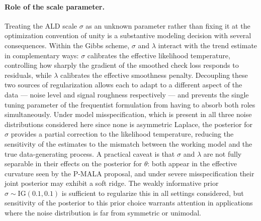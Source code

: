 \paragraph{Role of the scale parameter.}
Treating the ALD scale $\sigma$ as an unknown parameter rather than fixing it at the optimization convention of unity is a substantive modeling decision with several consequences. Within the Gibbs scheme, $\sigma$ and $\lambda$ interact with the trend estimate in complementary ways: $\sigma$ calibrates the effective likelihood temperature, controlling how sharply the gradient of the smoothed check loss responds to residuals, while $\lambda$ calibrates the effective smoothness penalty. Decoupling these two sources of regularization allows each to adapt to a different aspect of the data --- noise level and signal roughness respectively --- and prevents the single tuning parameter of the frequentist formulation from having to absorb both roles simultaneously. Under model misspecification, which is present in all three noise distributions considered here since none is asymmetric Laplace, the posterior for $\sigma$ provides a partial correction to the likelihood temperature, reducing the sensitivity of the estimates to the mismatch between the working model and the true data-generating process. A practical caveat is that $\sigma$ and $\lambda$ are not fully separable in their effects on the posterior for $\theta$: both appear in the effective curvature seen by the P-MALA proposal, and under severe misspecification their joint posterior may exhibit a soft ridge. The weakly informative prior $\sigma \sim \mathrm{IG}(0.1, 0.1)$ is sufficient to regularize this in all settings considered, but sensitivity of the posterior to this prior choice warrants attention in applications where the noise distribution is far from symmetric or unimodal.

